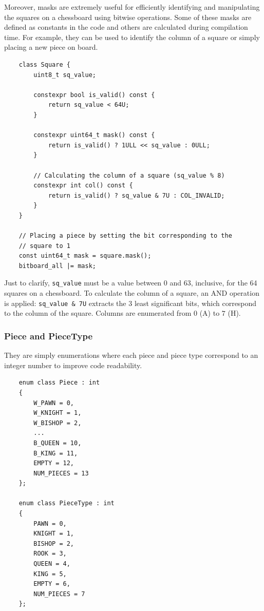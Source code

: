 \vspace{1em}

\noindent Moreover, masks are extremely useful for efficiently identifying and manipulating the squares on a chessboard using bitwise operations. Some of these masks are defined as constants in the code and others are calculated during compilation time. For example, they can be used to identify the column of a square or simply placing a new piece on board.

\begin{lstlisting}
    class Square {
        uint8_t sq_value;

        constexpr bool is_valid() const {
            return sq_value < 64U;
        }

        constexpr uint64_t mask() const {
            return is_valid() ? 1ULL << sq_value : 0ULL;
        }

        // Calculating the column of a square (sq_value % 8)
        constexpr int col() const {
            return is_valid() ? sq_value & 7U : COL_INVALID;
        }
    }

    // Placing a piece by setting the bit corresponding to the
    // square to 1
    const uint64_t mask = square.mask();
    bitboard_all |= mask;
\end{lstlisting}

\noindent Just to clarify, \texttt{sq\_value} must be a value between $0$ and $63$, inclusive, for the 64 squares on a chessboard. To calculate the column of a square, an AND operation is applied: \texttt{sq\_value \& 7U} extracts the 3 least significant bits, which correspond to the column of the square. Columns are enumerated from $0$ (A) to $7$ (H).

\subsubsection{Piece and PieceType}

They are simply enumerations where each piece and piece type correspond to an integer number to improve code readability.

\begin{lstlisting}
    enum class Piece : int
    {
        W_PAWN = 0,
        W_KNIGHT = 1,
        W_BISHOP = 2,
        ...
        B_QUEEN = 10,
        B_KING = 11,
        EMPTY = 12,
        NUM_PIECES = 13
    };

    enum class PieceType : int
    {
        PAWN = 0,
        KNIGHT = 1,
        BISHOP = 2,
        ROOK = 3,
        QUEEN = 4,
        KING = 5,
        EMPTY = 6,
        NUM_PIECES = 7
    };
\end{lstlisting}


